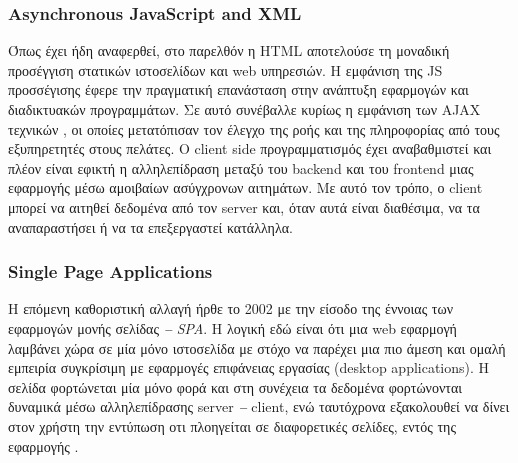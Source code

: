 \subsubsection{Asynchronous JavaScript and XML}

Όπως έχει ήδη αναφερθεί, στο παρελθόν η HTML αποτελούσε τη μοναδική προσέγγιση στατικών ιστοσελίδων και web υπηρεσιών. Η εμφάνιση της JS προσσέγισης έφερε την πραγματική επανάσταση στην ανάπτυξη εφαρμογών και διαδικτυακών προγραμμάτων. Σε αυτό συνέβαλλε κυρίως η εμφάνιση των AJAX τεχνικών \cite{[AJAX1],[AJAX2]}, οι οποίες μετατόπισαν τον έλεγχο της ροής και της πληροφορίας από τους εξυπηρετητές στους πελάτες. Ο client side προγραμματισμός έχει αναβαθμιστεί και πλέον είναι εφικτή η αλληλεπίδραση μεταξύ του backend και του frontend μιας εφαρμογής μέσω αμοιβαίων ασύγχρονων αιτημάτων. Με αυτό τον τρόπο, ο client μπορεί να αιτηθεί δεδομένα από τον server και, όταν αυτά είναι διαθέσιμα, να τα αναπαραστήσει ή να τα επεξεργαστεί κατάλληλα.


\subsubsection{Single Page Applications}
Η επόμενη καθοριστική αλλαγή ήρθε το 2002 με την είσοδο της έννοιας των εφαρμογών μονής σελίδας \textit{\textbf{--}} \textit{SPA}. H λογική εδώ είναι ότι μια web εφαρμογή λαμβάνει χώρα σε μία μόνο ιστοσελίδα με στόχο να παρέχει μια πιο άμεση και ομαλή
εμπειρία συγκρίσιμη με εφαρμογές επιφάνειας εργασίας (desktop applications). Η σελίδα φορτώνεται μία μόνο φορά και στη συνέχεια τα δεδομένα φορτώνονται δυναμικά μέσω αλληλεπίδρασης server \textit{\textbf{--}} client, ενώ ταυτόχρονα εξακολουθεί να δίνει στον χρήστη την εντύπωση οτι πλοηγείται σε διαφορετικές σελίδες, εντός της εφαρμογής \cite{[SPA1]}.

